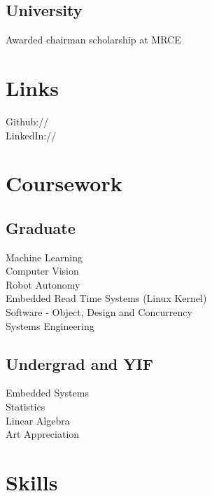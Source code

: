 \documentclass[]{resume-openfont}
\begin{document}
\begin{minipage}[t]{0.36\textwidth}
\subsection{University}
Awarded chairman scholarship at MRCE \\
\sectionsep


\section{Links} 
Github:// \href{https://github.com/tusharchugh}{} \\
LinkedIn://  \href{https://www.linkedin.com/in/tusharchugh}{} \\
\sectionsep


\section{Coursework}
\subsection{Graduate}
Machine Learning \\
Computer Vision \\
Robot Autonomy \\
Embedded Read Time Systems (Linux Kernel) \\
Software - Object, Design and Concurrency \\
Systems Engineering \\
\sectionsep

\subsection{Undergrad and YIF}
Embedded Systems \\
Statistics \\
Linear Algebra \\
Art Appreciation \\

\section{Skills}

\end{minipage}
\end{document}
